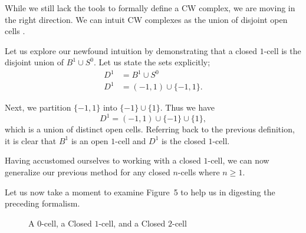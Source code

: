 \documentclass[12pt,oneside]{amsbook}
\begin{document}
While we still lack the tools to formally define a CW complex, we are moving in the right direction. We can intuit CW complexes as the union of disjoint open cells \cite{cw}.

Let us explore our newfound intuition by demonstrating that a closed $1$-cell is the disjoint union of $B^1 \cup S^0$. Let us state the sets explicitly;
\begin{align*}
D^1 &= B^1 \cup S^0\\
D^1 &= (-1,1) \cup \{-1,1\}.
\end{align*}

Next, we partition $\{-1,1\}$ into $\{-1\}\cup\{1\}$. Thus we have $$D^1 = (-1,1) \cup \{-1\}\cup\{1\},$$ which is a union of distinct open cells. Referring back to the previous definition, it is clear that $B^1$ is an open $1$-cell and $D^1$ is the closed $1$-cell.

Having accustomed ourselves to working with a closed $1$-cell, we can now generalize our previous method for any closed $n$-cells where $n\geq 1$.

Let us now take a moment to examine Figure~5 to help us in digesting the preceding formalism.

\begin{figure}[h]
\label{fig:nwacells}
\centering
\caption{A $0$-cell, a Closed $1$-cell, and a Closed $2$-cell}
\hspace{.5in}
\hspace{.5in}
\end{figure}
\end{document}
